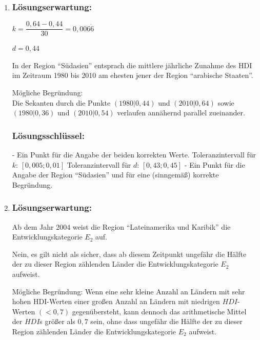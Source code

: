 \begin{langesbeispiel}
{\begin{enumerate}
- Ein Punkt für die richtige Lösung.
Toleranzintervall: $[0,88; 0,91]$
Die Aufgabe ist auch dann als richtig gelöst zu werten, wenn bei korrektem Ansatz das Ergebnis
aufgrund eines Rechenfehlers nicht richtig ist.
- Ein Punkt für eine korrekte Gleichung und die richtige Lösung. Äquivalente Gleichungen sind
als richtig zu werten.
Toleranzintervall: $[0,85; 0,89]$

\item \subsubsection{Lösungserwartung:}

$k=\dfrac{0,64-0,44}{30}=0,006\dot{6}$

$d=0,44$

In der Region "`Südasien"' entsprach die mittlere jährliche Zunahme des HDI im Zeitraum 1980 bis 2010 am ehesten jener der Region "`arabische Staaten"'.

Mögliche Begründung:\\
Die Sekanten durch die Punkte $(1980|0,44)$ und $(2010|0,64)$ sowie $(1980|0,36)$ und $(2010|0,54)$ verlaufen annähernd parallel zueinander. 

\subsubsection{Lösungsschlüssel:}

- Ein Punkt für die Angabe der beiden korrekten Werte.
Toleranzintervall für $k$: $[0,005; 0,01]$
Toleranzintervall für $d$: $[0,43; 0,45]$
- Ein Punkt für die Angabe der Region "`Südasien"' und für eine (sinngemäß) korrekte Begründung.

\item \subsubsection{Lösungserwartung:}

Ab dem Jahr 2004 weist die Region "`Lateinamerika und Karibik"' die Entwicklungskategorie $E_2$
auf.\leer

Nein, es gilt nicht als sicher, dass ab diesem Zeitpunkt ungefähr die Hälfte der zu dieser Region
zählenden Länder die Entwicklungskategorie $E_2$ aufweist.


Mögliche Begründung:
Wenn eine sehr kleine Anzahl an Ländern mit sehr hohen HDI-Werten einer großen Anzahl an
Ländern mit niedrigen $HDI$-Werten $(< 0,7)$ gegenübersteht, kann dennoch das arithmetische
Mittel der $HDI$s größer als $0,7$ sein, ohne dass ungefähr die Hälfte der zu dieser Region zählenden
Länder die Entwicklungskategorie $E_2$ aufweist.


\end{enumerate}}
\end{langesbeispiel}
